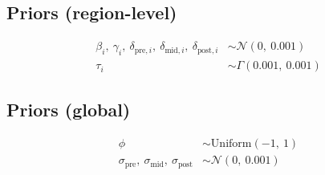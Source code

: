 \documentclass{article}
\begin{document}
\subsection*{Priors (region-level)}

\begin{align}
  \beta_i,\ \gamma_i,\ \delta_{\text{pre},i},\ \delta_{\text{mid},i},\ \delta_{\text{post},i} &\sim \mathcal{N}(0,\ 0.001) \\
  \tau_i &\sim \Gamma(0.001,\ 0.001)
\end{align}

\subsection*{Priors (global)}

\begin{align}
  \phi &\sim \mathrm{Uniform}(-1,\ 1) \\
  \sigma_{\text{pre}},\ \sigma_{\text{mid}},\ \sigma_{\text{post}} &\sim \mathcal{N}(0,\ 0.001)
\end{align}
\end{document}
